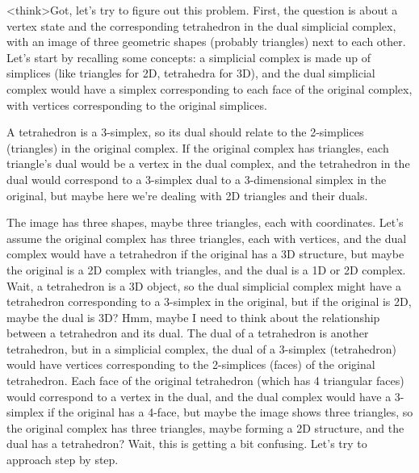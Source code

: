 <think>Got, let's try to figure out this problem. First, the question is about a vertex state and the corresponding tetrahedron in the dual simplicial complex, with an image of three geometric shapes (probably triangles) next to each other. Let's start by recalling some concepts: a simplicial complex is made up of simplices (like triangles for 2D, tetrahedra for 3D), and the dual simplicial complex would have a simplex corresponding to each face of the original complex, with vertices corresponding to the original simplices. 

A tetrahedron is a 3-simplex, so its dual should relate to the 2-simplices (triangles) in the original complex. If the original complex has triangles, each triangle's dual would be a vertex in the dual complex, and the tetrahedron in the dual would correspond to a 3-simplex dual to a 3-dimensional simplex in the original, but maybe here we're dealing with 2D triangles and their duals. 

The image has three shapes, maybe three triangles, each with coordinates. Let's assume the original complex has three triangles, each with vertices, and the dual complex would have a tetrahedron if the original has a 3D structure, but maybe the original is a 2D complex with triangles, and the dual is a 1D or 2D complex. Wait, a tetrahedron is a 3D object, so the dual simplicial complex might have a tetrahedron corresponding to a 3-simplex in the original, but if the original is 2D, maybe the dual is 3D? Hmm, maybe I need to think about the relationship between a tetrahedron and its dual. The dual of a tetrahedron is another tetrahedron, but in a simplicial complex, the dual of a 3-simplex (tetrahedron) would have vertices corresponding to the 2-simplices (faces) of the original tetrahedron. Each face of the original tetrahedron (which has 4 triangular faces) would correspond to a vertex in the dual, and the dual complex would have a 3-simplex if the original has a 4-face, but maybe the image shows three triangles, so the original complex has three triangles, maybe forming a 2D structure, and the dual has a tetrahedron? Wait, this is getting a bit confusing. Let's try to approach step by step.

